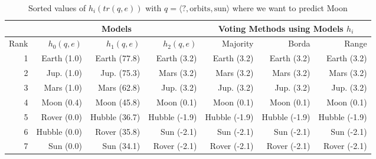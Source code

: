 \begin{table} 
\centering 
\begin{tabular}{r|r|r|r|r|r|r}
&\multicolumn{3}{|c|}{Models}&
\multicolumn{3}{|c}{Voting Methods using Models $h_i$}\\
 \hline 
Rank &$h_0(q, e)$ &$h_1(q, e)$ &$h_2(q, e)$ &Majority &Borda &Range\\
\hline
1 &Earth (1.0)&		Earth (77.8)&		Earth (3.2)&		Earth (3.2) &Earth (3.2) &Earth (3.2)\\
2 &Jup. (1.0)&		Jup. (75.3)&		Mars (3.2)&		Mars (3.2) &Mars (3.2) &Mars (3.2)\\
3 &Mars (1.0)&		Mars (62.8)&		Jup. (3.2)&		Jup. (3.2) &Jup. (3.2) &Jup. (3.2)\\
4 &Moon (0.4)&		Moon (45.8)&		Moon (0.1)&		Moon (0.1) &Moon (0.1) &Moon (0.1)\\
\hline \hline
5 &Rover (0.0)&		Hubble (36.7)&		Hubble (-1.9)&		Hubble (-1.9) &Hubble (-1.9) &Hubble (-1.9)\\
6 &Hubble (0.0)&		Rover (35.8)&		Sun (-2.1)&		Sun (-2.1) &Sun (-2.1) &Sun (-2.1)\\
7 &Sun (0.0)&		Sun (34.1)&		Rover (-2.1)&		Rover (-2.1) &Rover (-2.1) &Rover (-2.1)\\
\end{tabular}
\caption{Sorted values of $h_i(tr(q,e))$ with $q=\langle ?, \text{orbits}, \text{sun} \rangle$ where we want to predict Moon}
\end{table}